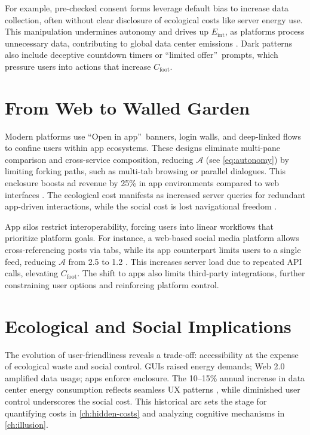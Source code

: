 \documentclass[openany]{book}
\newcommand{\Eint}{E_{\mathrm{int}}} %
\newcommand{\Cfoot}{C_{\mathrm{foot}}} %
\newcommand{\Auton}{\mathcal{A}} %
\begin{document}
For example, pre-checked consent forms leverage default bias to increase data collection, often without clear disclosure of ecological costs like server energy use. This manipulation undermines autonomy and drives up \(\Eint\), as platforms process unnecessary data, contributing to global data center emissions \citep{extentia2024}. Dark patterns also include deceptive countdown timers or \textquotedblleft limited offer\textquotedblright\ prompts, which pressure users into actions that increase \(\Cfoot\).

\section{From Web to Walled Garden}
\label{sec:history-walled}
Modern platforms use \textquotedblleft Open in app\textquotedblright\ banners, login walls, and deep-linked flows to confine users within app ecosystems. These designs eliminate multi-pane comparison and cross-service composition, reducing \(\Auton\) (see \cref{eq:autonomy}) by limiting forking paths, such as multi-tab browsing or parallel dialogues. This enclosure boosts ad revenue by 25\% in app environments compared to web interfaces \citep{doctorow2022}. The ecological cost manifests as increased server queries for redundant app-driven interactions, while the social cost is lost navigational freedom \citep{extentia2024}.

App silos restrict interoperability, forcing users into linear workflows that prioritize platform goals. For instance, a web-based social media platform allows cross-referencing posts via tabs, while its app counterpart limits users to a single feed, reducing \(\Auton\) from 2.5 to 1.2 \citep{doctorow2022}. This increases server load due to repeated API calls, elevating \(\Cfoot\). The shift to apps also limits third-party integrations, further constraining user options and reinforcing platform control.

\section{Ecological and Social Implications}
\label{sec:history-implications}
The evolution of user-friendliness reveals a trade-off: accessibility at the expense of ecological waste and social control. GUIs raised energy demands; Web 2.0 amplified data usage; apps enforce enclosure. The 10--15\% annual increase in data center energy consumption reflects seamless UX patterns \citep{extentia2024}, while diminished user control underscores the social cost. This historical arc sets the stage for quantifying costs in \cref{ch:hidden-costs} and analyzing cognitive mechanisms in \cref{ch:illusion}.
\end{document}
